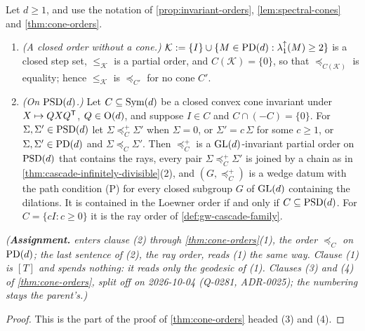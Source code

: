\begin{lemma}
\label{lem:cone-orders-psd}
\leanok
Let $d \ge 1$, and use the notation of \ref{prop:invariant-orders}, \ref{lem:spectral-cones} and
\ref{thm:cone-orders}.
\begin{enumerate}
\item \emph{(A closed order without a cone.)} $\mathcal K := \{I\} \cup \{M \in \mathrm{PD}(d) :
\lambda^\uparrow_1(M) \ge 2\}$ is a closed step set, $\le_{\mathcal K}$ is a partial order, and
$C(\mathcal K) = \{0\}$, so that $\preceq_{C(\mathcal K)}$ is equality; hence $\le_{\mathcal K}$ is
$\preceq_{C'}$ for no cone $C'$.
\item \emph{(On $\mathrm{PSD}(d)$.)} Let $C \subseteq \mathrm{Sym}(d)$ be a closed convex cone invariant under
$X \mapsto QXQ^{\mathsf{T}}$, $Q \in \mathrm{O}(d)$, and suppose $I \in C$ and $C \cap (-C) = \{0\}$. For
$\Sigma, \Sigma' \in \mathrm{PSD}(d)$ let $\Sigma \preceq^+_C \Sigma'$ when $\Sigma = 0$, or $\Sigma' = c\,\Sigma$
for some $c \ge 1$, or $\Sigma, \Sigma' \in \mathrm{PD}(d)$ and $\Sigma \preceq_C \Sigma'$. Then $\preceq^+_C$ is
a $\mathrm{GL}(d)$-invariant partial order on $\mathrm{PSD}(d)$ that contains the rays, every pair
$\Sigma \preceq^+_C \Sigma'$ is joined by a chain as in \ref{thm:cascade-infinitely-divisible}(2), and
$(G, \preceq^+_C)$ is a wedge datum with the path condition (P) for every closed subgroup $G$ of
$\mathrm{GL}(d)$ containing the dilations. It is contained in the Loewner order if and only if
$C \subseteq \mathrm{PSD}(d)$. For $C = \{cI : c \ge 0\}$ it is the ray order of \ref{def:gw-cascade-family}.
\end{enumerate}
\statusA\quad{}\quad\emph{(\textbf{Assignment.}  enters clause (2) through
\ref{thm:cone-orders}(1), the order $\preceq_C$ on $\mathrm{PD}(d)$; the last sentence of (2), the ray order, reads (1)
the same way. Clause (1) is $[T]$ and spends nothing: it reads only the geodesic of (1). Clauses (3) and (4)
of \ref{thm:cone-orders}, split off on 2026-10-04 (Q-0281, ADR-0025); the numbering stays the parent's.)}
\end{lemma}

\begin{proof}
\leanok
This is the part of the proof of \ref{thm:cone-orders} headed (3) and (4).
\end{proof}

